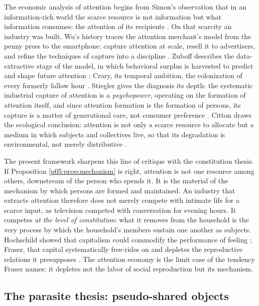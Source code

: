 The economic analysis of attention begins from Simon's observation that in an information-rich world the scarce resource is not information but what information consumes: the attention of its recipients \parencite{simon1971}. On that scarcity an industry was built. Wu's history traces the attention merchant's model from the penny press to the smartphone: capture attention at scale, resell it to advertisers, and refine the techniques of capture into a discipline \parencite{wu2016}. Zuboff describes the data-extractive stage of the model, in which behavioral surplus is harvested to predict and shape future attention \parencite{zuboff2019}; Crary, its temporal ambition, the colonization of every formerly fallow hour \parencite{crary2013}. Stiegler gives the diagnosis its depth: the systematic industrial capture of attention is a \emph{psychopower}, operating on the formation of attention itself, and since attention formation is the formation of persons, its capture is a matter of generational care, not consumer preference \parencite{stiegler2010}. Citton draws the ecological conclusion: attention is not only a scarce resource to allocate but a medium in which subjects and collectives live, so that its degradation is environmental, not merely distributive \parencite{citton2017}.

The present framework sharpens this line of critique with the constitution thesis. If Proposition \ref{p05:prop:mechanism} is right, attention is not one resource among others, downstream of the person who spends it. It is the material of the mechanism by which persons are formed and maintained. An industry that extracts attention therefore does not merely compete with intimate life for a scarce input, as television competed with conversation for evening hours. It competes \emph{at the level of constitution}: what it removes from the household is the very process by which the household's members sustain one another as subjects. Hochschild showed that capitalism could commodify the performance of feeling \parencite{hochschild1983}; Fraser, that capital systematically free-rides on and depletes the reproductive relations it presupposes \parencite{fraser2016}. The attention economy is the limit case of the tendency Fraser names: it depletes not the labor of social reproduction but its mechanism.

\subsection{The parasite thesis: pseudo-shared objects}
\label{p05:sec:parasite}

